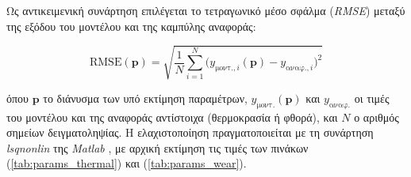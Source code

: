 Ως αντικειμενική συνάρτηση επιλέγεται το τετραγωνικό μέσο σφάλμα (\textit{RMSE}) μεταξύ της εξόδου του μοντέλου και της καμπύλης αναφοράς:

\begin{equation}
    \mathrm{RMSE}(\mathbf{p}) = \sqrt{\frac{1}{N}\sum_{i=1}^{N}\bigl(y_{\text{μοντ.},i}(\mathbf{p}) - y_{\text{αναφ.},i}\bigr)^2}
    \label{eq:paramFittingObjective}
\end{equation}

όπου $\mathbf{p}$ το διάνυσμα των υπό εκτίμηση παραμέτρων, $y_{\text{μοντ.}}(\mathbf{p})$ και $y_{\text{αναφ.}}$ οι τιμές του μοντέλου και της αναφοράς αντίστοιχα (θερμοκρασία ή φθορά), και $N$ ο αριθμός σημείων δειγματοληψίας. Η ελαχιστοποίηση πραγματοποιείται με τη συνάρτηση \textit{lsqnonlin} της \textit{Matlab} \cite{mathworks_lsqnonlin}, με αρχική εκτίμηση τις τιμές των πινάκων (\ref{tab:params_thermal}) και (\ref{tab:params_wear}).
